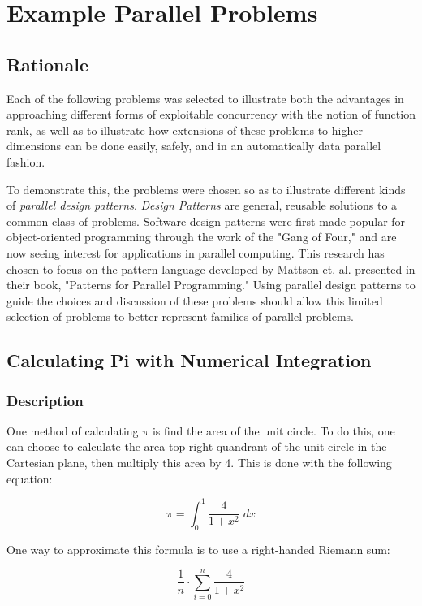 \chapter{Example Parallel Problems}
\label{probs}

\section{Rationale}
Each of the following problems was selected to illustrate 
both the advantages in approaching different forms of exploitable concurrency with the notion of function rank, 
as well as to illustrate how extensions of these problems to higher dimensions can be done easily, safely, 
and in an automatically data parallel fashion.

To demonstrate this, the problems were chosen so as to illustrate different kinds of \textit{parallel design patterns}. 
\textit{Design Patterns} are general, reusable solutions to a common class of problems. %
Software design patterns were first made popular for object-oriented programming through the work of the "Gang of Four," %
and are now seeing interest for applications in parallel computing. %
This research has chosen to focus on the pattern language developed by Mattson et. al. 
presented in their book, "Patterns for Parallel Programming." %
Using parallel design patterns to guide the choices and discussion of these problems 
should allow this limited selection of problems to better represent families of parallel problems.

\section{Calculating Pi with Numerical Integration}
\subsection{Description}
One method of calculating $\pi$ is find the area of the unit circle. 
To do this, one can choose to calculate the area top right quandrant of the unit circle in the Cartesian plane, 
then multiply this area by 4. 
This is done with the following equation:

\[\pi = \int_0^1 \frac{4}{1 + x^2} \; dx\]

One way to approximate this formula is to use a right-handed Riemann sum:

\[\frac{1}{n} \cdot \sum_{i=0}^n \frac{4}{1 + x^2} \]

